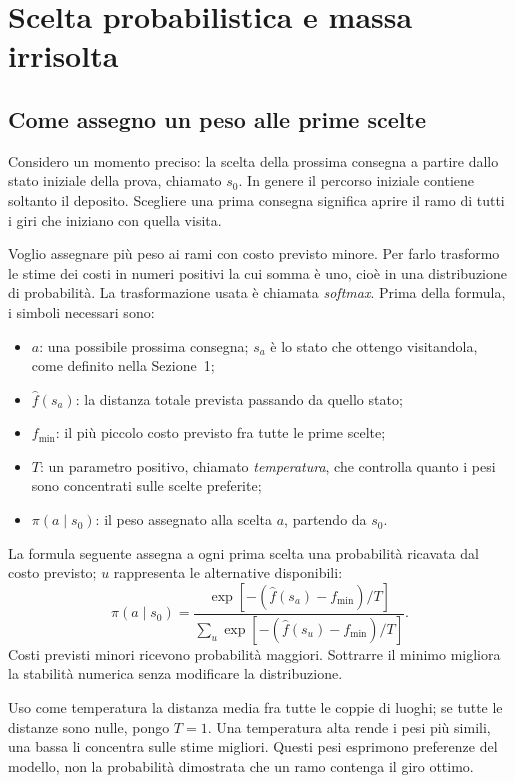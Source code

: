 \section{Scelta probabilistica e massa irrisolta}
\label{sec:probability}
\subsection{Come assegno un peso alle prime scelte}
Considero un momento preciso: la scelta della prossima consegna a partire
dallo stato iniziale della prova, chiamato $s_0$. In genere il percorso
iniziale contiene soltanto il deposito. Scegliere una prima consegna
significa aprire il ramo di tutti i giri che iniziano con quella visita.

Voglio assegnare più peso ai rami con costo previsto minore. Per farlo
trasformo le stime dei costi in numeri positivi la cui somma è uno,
cioè in una distribuzione di probabilità. La trasformazione usata è
chiamata \emph{softmax}. Prima della formula, i simboli necessari sono:
\begin{itemize}
\item $a$: una possibile prossima consegna; $s_a$ è lo stato che ottengo
  visitandola, come definito nella Sezione~1;
\item $\widehat f(s_a)$: la distanza totale prevista passando da quello stato;
\item $f_{\min}$: il più piccolo costo previsto fra tutte le prime scelte;
\item $T$: un parametro positivo, chiamato \emph{temperatura}, che controlla
  quanto i pesi sono concentrati sulle scelte preferite;
\item $\pi(a\mid s_0)$: il peso assegnato alla scelta $a$, partendo da $s_0$.
\end{itemize}
La formula seguente assegna a ogni prima scelta una probabilità ricavata
dal costo previsto; $u$ rappresenta le alternative disponibili:
\[
 \pi(a\mid s_0)=
 \frac{\exp[-(\widehat f(s_a)-f_{\min})/T]}
 {\sum_u\exp[-(\widehat f(s_u)-f_{\min})/T]}.
\]
Costi previsti minori ricevono probabilità maggiori. Sottrarre il minimo
migliora la stabilità numerica senza modificare la distribuzione.

Uso come temperatura la distanza media fra tutte le coppie di luoghi;
se tutte le distanze sono nulle, pongo $T=1$. Una temperatura alta rende
i pesi più simili, una bassa li concentra sulle stime migliori.
Questi pesi esprimono preferenze del modello, non la probabilità dimostrata
che un ramo contenga il giro ottimo.

